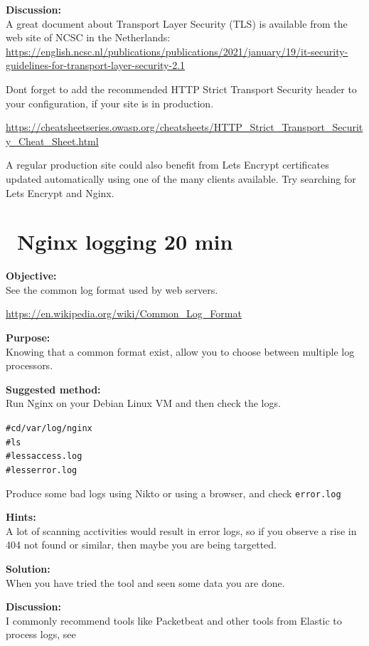 \documentclass[a4paper,11pt,notitlepage]{report}
\begin{document}
{\bf Discussion:}\\
A great document about Transport Layer Security (TLS) is available from the web site of NCSC in the Netherlands:\\
{\scriptsize\url{https://english.ncsc.nl/publications/publications/2021/january/19/it-security-guidelines-for-transport-layer-security-2.1}}

Dont forget to add the recommended HTTP Strict Transport Security header to your configuration, if your site is in production.

{\footnotesize\url{https://cheatsheetseries.owasp.org/cheatsheets/HTTP_Strict_Transport_Security_Cheat_Sheet.html}}

A regular production site could also benefit from Lets Encrypt certificates updated automatically using one of the many clients available. Try searching for Lets Encrypt and Nginx.


\chapter{\faExclamationTriangle\ Nginx logging  20 min}
\label{ex:nginx-logging}

{\bf Objective:}\\
See the common log format used by web servers.

\url{https://en.wikipedia.org/wiki/Common_Log_Format}


{\bf Purpose:}\\
Knowing that a common format exist, allow you to choose between multiple log processors.


{\bf Suggested method:}\\
Run Nginx on your Debian Linux VM and then check the logs.


\begin{alltt}
# cd /var/log/nginx
# ls
# less access.log
# less error.log
\end{alltt}


Produce some bad logs using Nikto or using a browser, and check \verb+error.log+


{\bf Hints:}\\
A lot of scanning acctivities would result in error logs, so if you observe a rise in 404 not found or similar, then maybe you are being targetted.

{\bf Solution:}\\
When you have tried the tool and seen some data you are done.

{\bf Discussion:}\\
I commonly recommend tools like Packetbeat and other tools from Elastic to process logs, see 
\end{document}
